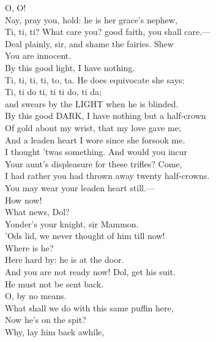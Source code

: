 \documentclass[a4paper,oneside]{memoir}
\begin{document}
\begin{drama*}
\dapperspeaks O, O!\\
\facespeaks {} Nay, pray you, hold: he is her grace's nephew,\\
Ti, ti, ti? What care you? good faith, you shall care.---\\
Deal plainly, sir, and shame the fairies. Shew\\
You are innocent.\\
\dapperspeaks {} By this good light, I have nothing.\\
\subtlespeaks Ti, ti, ti, ti, to, ta. He does equivocate she says:\\
Ti, ti do ti, ti ti do, ti da;\\
and swears by the LIGHT when he is blinded.\\
\dapperspeaks By this good DARK, I have nothing but a half-crown\\
Of gold about my wrist, that my love gave me;\\
And a leaden heart I wore since she forsook me.\\
\facespeaks I thought 'twas something. And would you incur\\
Your aunt's displeasure for these trifles? Come,\\
I had rather you had thrown away twenty half-crowns.\\
You may wear your leaden heart still.---\\
 How now!\\
\subtlespeaks What news, Dol?\\
\dolspeaks {} Yonder's your knight, sir Mammon.\\
\facespeaks 'Ods lid, we never thought of him till now!\\
Where is he?\\
\dolspeaks {} Here hard by: he is at the door.\\
\subtlespeaks And you are not ready now! Dol, get his suit.\\
He must not be sent back.\\
\facespeaks {} O, by no means.\\
What shall we do with this same puffin here,\\
Now he's on the spit?\\
\subtlespeaks {} Why, lay him back awhile,\\

\end{drama*}
\end{document}
